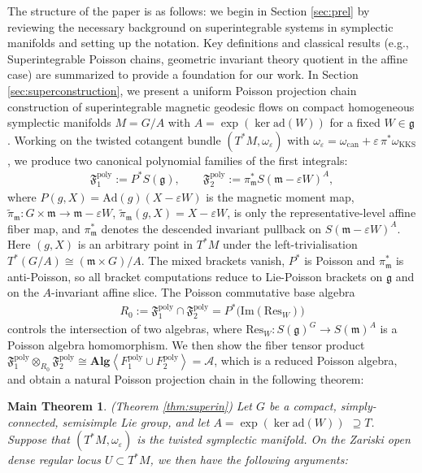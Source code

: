 \documentclass[11pt]{amsart}
\newtheorem*{theorem*}{Main Theorem}
\theoremstyle{definition}
\theoremstyle{plain}
\theoremstyle{conclusion}
\begin{document}
 
The structure of the paper is as follows: we begin in Section \ref{sec:prel} by reviewing the necessary background on superintegrable systems in symplectic manifolds and setting up the notation. Key definitions and classical results (e.g., Superintegrable Poisson chains, geometric invariant theory quotient in the affine case) are summarized to provide a foundation for our work.  In Section \ref{sec:superconstruction}, we present a uniform Poisson projection chain construction of superintegrable magnetic geodesic flows on compact homogeneous symplectic manifolds $M=G/A$ with $A = \exp (\ker \mathrm{ad}(W))$ for a fixed $W \in \mathfrak{g}$. Working on the twisted cotangent bundle $(T^*M,\omega_\varepsilon)$ with  $\omega_\varepsilon=\omega_{\mathrm{can}}+\varepsilon\,\pi^*\omega_{\mathrm{KKS}}$, we produce two canonical polynomial families of the first integrals: \begin{align*}
    \mathfrak{F}_1^{\mathrm{poly}}:=P^*S(\mathfrak{g}),\qquad \mathfrak{F}_2^{\mathrm{poly}}:=\pi_{\mathfrak{m}}^*S(\mathfrak{m}-\varepsilon W)^A,
\end{align*} where $P(g,X)=\mathrm{Ad}(g)(X-\varepsilon W)$ is the magnetic moment map, $\widetilde{\pi}_{\mathfrak{m}}:G\times\mathfrak{m}\to\mathfrak{m}-\varepsilon W$, $\widetilde{\pi}_{\mathfrak{m}}(g,X)=X-\varepsilon W$, is only the representative-level affine fiber map, and $\pi_{\mathfrak{m}}^*$ denotes the descended invariant pullback on $S(\mathfrak{m}-\varepsilon W)^A$. Here $(g,X)$ is an arbitrary point in $T^*M$ under the left-trivialisation $T^*(G/A) \cong (\mathfrak{m} \times G)/A$. The mixed brackets vanish, $P^*$ is Poisson and $\pi_{\mathfrak{m}}^*$ is anti-Poisson, so all bracket computations reduce to Lie-Poisson brackets on $\mathfrak{g}$ and on the $A$-invariant affine slice. The Poisson commutative base algebra \begin{align*}
    R_0:= \mathfrak{F}_1^{\mathrm{poly}}\cap \mathfrak{F}_2^{\mathrm{poly}} = P^* \big(\mathrm{Im}(\mathrm{Res}_W)\big)
\end{align*}  controls the intersection of two algebras, where $\mathrm{Res}_W: S(\mathfrak{g})^G \rightarrow S(\mathfrak{m})^A$ is a Poisson algebra homomorphism. We then show the fiber tensor product $\mathfrak{F}_1^{\mathrm{poly}}\otimes_{R_0}\mathfrak{F}_2^{\mathrm{poly}} \cong \textbf{Alg} \left\langle F_1^{\mathrm{poly}} \cup F_2^\mathrm{poly} \right\rangle = \mathcal{A} $, which is a reduced Poisson algebra, and obtain a natural Poisson projection chain in the following theorem: \begin{theorem*}
(Theorem \ref{thm:superin}) %
   Let $G$ be a compact, simply-connected, semisimple Lie group, and let $A= \exp(\ker\mathrm{ad}(W)) $ $\supseteq T$. Suppose that $(T^*M,\omega_\varepsilon)$ is the twisted symplectic manifold. On the Zariski open dense regular locus $U \subset T^*M$, we then have the following arguments:


\end{theorem*}
\end{document}
